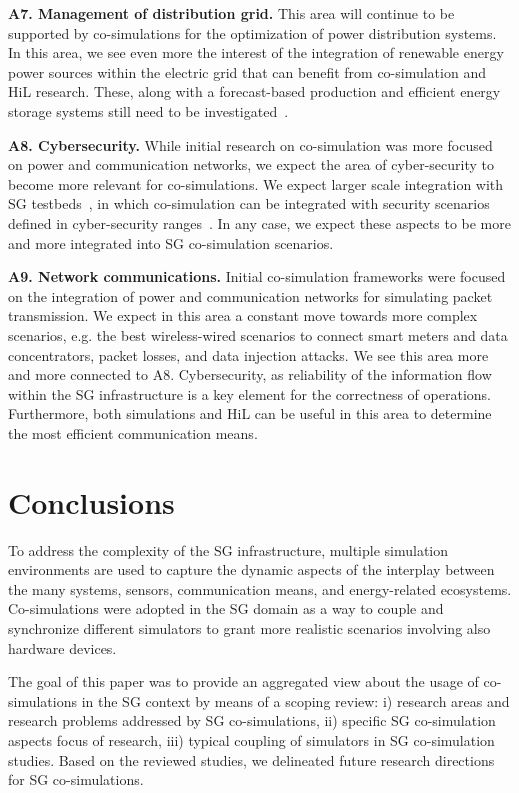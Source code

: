 \documentclass[1p]{elsarticle} %
\begin{document}
\noindent \textbf{A7. Management of distribution grid.} This area will continue to be supported by co-simulations for the optimization of power distribution systems. In this area, we see even more the interest of the integration of renewable energy power sources within the electric grid that can benefit from co-simulation and HiL research. These, along with a forecast-based production and efficient energy storage systems still need to be investigated~\citep{Beidou2010}.


\noindent \textbf{A8. Cybersecurity.} While initial research on co-simulation was more focused on power and communication networks, we expect the area of cyber-security to become more relevant for co-simulations. We expect larger scale integration with SG testbeds~\cite{ref:cintuglu2017survey}, in which co-simulation can be integrated with security scenarios defined in cyber-security ranges~\citep{ref:vykopal2017kypo}. In any case, we expect these aspects to be more and more integrated into SG co-simulation scenarios.


\noindent \textbf{A9. Network communications.}  Initial co-simulation frameworks were focused on the integration of power and communication networks for simulating packet transmission. We expect in this area a constant move towards more complex scenarios, e.g. the best wireless-wired scenarios to connect smart meters and data concentrators, packet losses, and data injection attacks. We see this area more and more connected to A8. Cybersecurity, as reliability of the information flow within the SG infrastructure is a key element for the correctness of operations.  Furthermore, both simulations and HiL can be useful in this area to determine the most efficient communication means.


\section{Conclusions}
\label{sec:conclusion}

To address the complexity of the SG infrastructure, multiple simulation environments are used to capture the dynamic aspects of the interplay between the many systems, sensors, communication means, and energy-related ecosystems. Co-simulations were adopted in the SG domain as a way to couple and synchronize different simulators to grant more realistic scenarios involving also hardware devices.

The goal of this paper was to provide an aggregated view about the usage of co-simulations in the SG context by means of a scoping review: i) research areas and research problems addressed by SG co-simulations, ii) specific SG co-simulation aspects focus of research, iii) typical coupling of simulators in SG co-simulation studies. Based on the reviewed studies, we delineated future research directions for SG co-simulations.
\end{document}
